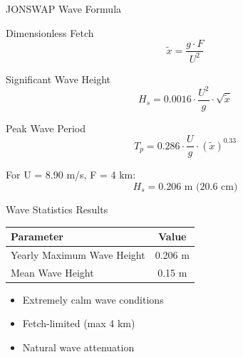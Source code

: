 \documentclass[10pt]{beamer}
\begin{document}
\begin{frame}{JONSWAP Wave Formula}
\begin{block}{Dimensionless Fetch}
\[
\tilde{x} = \frac{g \cdot F}{U^2}
\]
\end{block}

\begin{block}{Significant Wave Height}
\[
H_s = 0.0016 \cdot \frac{U^2}{g} \cdot \sqrt{\tilde{x}}
\]
\end{block}

\begin{block}{Peak Wave Period}
\[
T_p = 0.286 \cdot \frac{U}{g} \cdot (\tilde{x})^{0.33}
\]
\end{block}

\begin{example}
For U = 8.90 m/s, F = 4 km:
\[
H_s = 0.206 \mbox{ m (20.6 cm)}
\]
\end{example}
\end{frame}

\begin{frame}{Wave Statistics Results}
\begin{table}
\centering
\begin{tabular}{lc}
\hline
\textbf{Parameter} & \textbf{Value} \\
\hline
Yearly Maximum Wave Height & 0.206 m \\
Mean Wave Height & 0.15 m \\
\hline
\end{tabular}
\end{table}

\begin{center}
\color{success}{\Large All waves less than 25 cm!}
\end{center}

\begin{itemize}
    \item Extremely calm wave conditions
    \item Fetch-limited (max 4 km)
    \item Natural wave attenuation
\end{itemize}
\end{frame}
\end{document}
